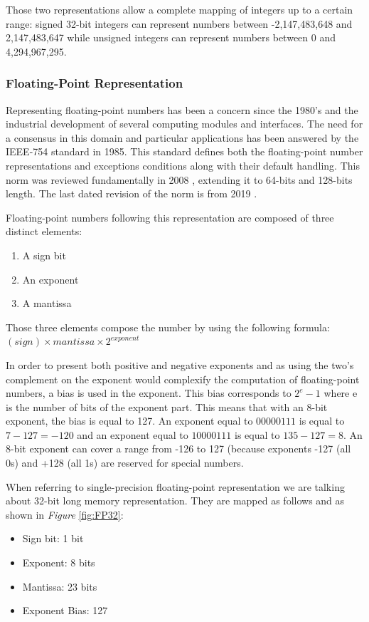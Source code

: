 Those two representations allow a complete mapping of integers up to a certain range: signed 32-bit integers can represent numbers between -2,147,483,648 and 2,147,483,647 while unsigned integers can represent numbers between 0 and 4,294,967,295.

\subsubsection{Floating-Point Representation}

Representing floating-point numbers has been a concern since the 1980's and the industrial development of several computing modules and interfaces. The need for a consensus in this domain and particular applications has been answered by the IEEE-754 standard \cite{Ieee754_1985} in 1985. This standard defines both the floating-point number representations and exceptions conditions along with their default handling. This norm was reviewed fundamentally in 2008 \cite{Ieee754_2008}, extending it to 64-bits and 128-bits length. The last dated revision of the norm is from 2019 \cite{Ieee754_2019}.

Floating-point numbers following this representation are composed of three distinct elements:
\begin{enumerate}
  \item A sign bit
  \item An exponent
  \item A mantissa
\end{enumerate}

Those three elements compose the number by using the following formula: $(\mathit{sign}) \times \mathit{mantissa} \times 2^{\mathit{exponent}}$

In order to present both positive and negative exponents and as using the two's complement on the exponent would complexify the computation of floating-point numbers, a bias is used in the exponent. This bias corresponds to $2^e - 1$ where e is the number of bits of the exponent part. This means that with an 8-bit exponent, the bias is equal to 127. An exponent equal to $00000111$ is equal to $7 - 127 = -120$ and an exponent equal to $10000111$ is equal to $135 - 127 = 8$. An 8-bit exponent can cover a range from -126 to 127 (because exponents -127 (all 0s) and +128 (all 1s) are reserved for special numbers.

When referring to single-precision floating-point representation we are talking about 32-bit long memory representation. They are mapped as follows and as shown in \emph{Figure} \ref{fig:FP32}:
\begin{itemize}
  \item Sign bit: 1 bit
  \item Exponent: 8 bits
  \item Mantissa: 23 bits
  \item Exponent Bias: 127
\end{itemize}

